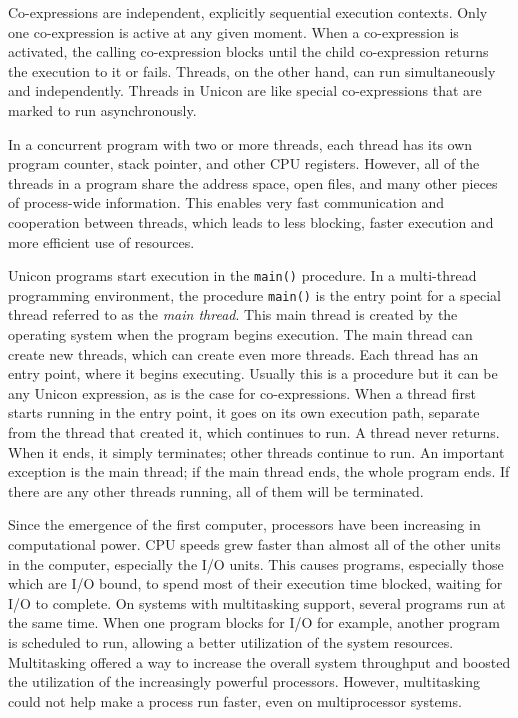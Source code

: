 Co-expressions are independent, explicitly sequential execution
contexts.  Only one co-expression is active at any given moment. When
a co-expression is activated, the calling co-expression blocks until
the child co-expression returns the execution to it or fails. Threads,
on the other hand, can run simultaneously and independently. Threads
in Unicon are like special co-expressions that are marked to run
asynchronously.

In a concurrent program with two or more threads, each thread has its
own program counter, stack pointer, and other CPU registers. However,
all of the threads in a program share the address space, open files,
and many other pieces of process-wide information. This enables very
fast communication and cooperation between threads, which leads to
less blocking, faster execution and more efficient use of resources.

Unicon programs start execution in the \texttt{main()} procedure. In a
multi-thread programming environment, the procedure \texttt{main()} is
the entry point for a special thread referred to as the \emph{main
thread}. This main thread is created by the operating system when the
program begins execution.  The main thread can create new threads,
which can create even more threads.  Each thread has an entry point,
where it begins executing.  Usually this is a procedure but it can be
any Unicon expression, as is the case for co-expressions.  When a
thread first starts running in the entry point, it goes on its own
execution path, separate from the thread that created it, which
continues to run. A thread never returns.  When it ends, it simply
terminates; other threads continue to run. An important exception is
the main thread; if the main thread ends, the whole program ends. If
there are any other threads running, all of them will be terminated.

Since the emergence of the first computer, processors have been
increasing in computational power. CPU speeds grew faster than almost
all of the other units in the computer, especially the I/O units. This
causes programs, especially those which are I/O bound, to spend most
of their execution time blocked, waiting for I/O to complete. On
systems with multitasking support, several programs run at the same
time. When one program blocks for I/O for example, another program is
scheduled to run, allowing a better utilization of the system
resources. Multitasking offered a way to increase the overall system
throughput and boosted the utilization of the increasingly powerful
processors.  However, multitasking could not help make a process run
faster, even on multiprocessor systems.


